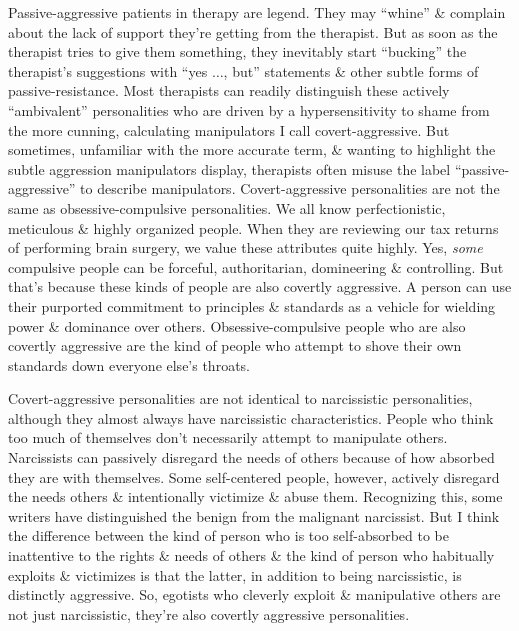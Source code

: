 \documentclass{article}
\numberwithin{equation}{section}
\begin{document}
Passive-aggressive patients in therapy are legend. They may ``whine'' \& complain about the lack of support they're getting from the therapist. But as soon as the therapist tries to give them something, they inevitably start ``bucking'' the therapist's suggestions with ``yes $\ldots$, but'' statements \& other subtle forms of passive-resistance. Most therapists can readily distinguish these actively ``ambivalent'' personalities who are driven by a hypersensitivity to shame from the more cunning, calculating manipulators I call covert-aggressive. But sometimes, unfamiliar with the more accurate term, \& wanting to highlight the subtle aggression manipulators display, therapists often misuse the label ``passive-aggressive'' to describe manipulators. Covert-aggressive personalities are not the same as obsessive-compulsive personalities. We all know perfectionistic, meticulous \& highly organized people. When they are reviewing our tax returns of performing brain surgery, we value these attributes quite highly. Yes, \textit{some} compulsive people can be forceful, authoritarian, domineering \& controlling. But that's because these kinds of people are also covertly aggressive. A person can use their purported commitment to principles \& standards as a vehicle for wielding power \& dominance over others. Obsessive-compulsive people who are also covertly aggressive are the kind of people who attempt to shove their own standards down everyone else's throats.

Covert-aggressive personalities are not identical to narcissistic personalities, although they almost always have narcissistic characteristics. People who think too much of themselves don't necessarily attempt to manipulate others. Narcissists can passively disregard the needs of others because of how absorbed they are with themselves. Some self-centered people, however, actively disregard the needs others \& intentionally victimize \& abuse them. Recognizing this, some writers have distinguished the benign from the malignant narcissist. But I think the difference between the kind of person who is too self-absorbed to be inattentive to the rights \& needs of others \& the kind of person who habitually exploits \& victimizes is that the latter, in addition to being narcissistic, is distinctly aggressive. So, egotists who cleverly exploit \& manipulative others are not just narcissistic, they're also covertly aggressive personalities.
\end{document}
